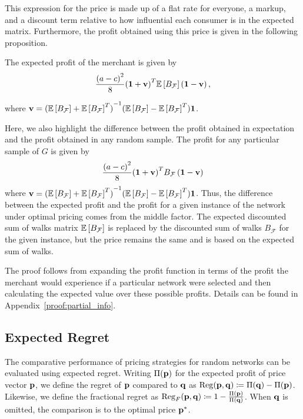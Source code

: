  This expression for the price is made up of a flat rate for everyone, a markup, and a discount term relative to how influential each consumer is in the expected matrix. Furthermore, the profit obtained using this price is given in the following proposition.

\begin{proposition}\label{prop:partial_info}\label{prop-info-prof}
     The expected profit of the merchant is given by 
     \begin{align*}
         \frac{{(a-c)}^2}{8} {\left(\mathbf{1} + \mathbf{v} \right)}^T \mathbb{E}\left[ B_\mathcal{F}\right] \left(\mathbf{1} - \mathbf{v} \right),
     \end{align*}

     where $\mathbf{v} = {(\mathbb{E}\left[ B_\mathcal{F}\right] + \mathbb{E}\left[ B_\mathcal{F}\right]^T)}^{-1} (\mathbb{E}\left[ B_\mathcal{F}\right] - \mathbb{E}\left[ B_\mathcal{F}\right]^T) \mathbf{1}$.
 \end{proposition}

Here, we also highlight the difference between the profit obtained in expectation and the profit obtained in any random sample. The profit for any particular sample of $G$ is given by
 \begin{equation*}
     \frac{{(a-c)}^2}{8} {\left(\mathbf{1} + \mathbf{v} \right)}^T B_\mathcal{F} \left(\mathbf{1} - \mathbf{v} \right)
 \end{equation*}
 where $\mathbf{v} = {(\mathbb{E}\left[ B_\mathcal{F}\right] + \mathbb{E}\left[ B_\mathcal{F}\right]^T)}^{-1} (\mathbb{E}\left[ B_\mathcal{F}\right] - \mathbb{E}\left[ B_\mathcal{F}\right]^T) \mathbf{1}$. Thus, the difference between the expected profit and the profit for a given instance of the network under optimal pricing comes from the middle factor. The expected discounted sum of walks matrix $\mathbb{E}\left[ B_\mathcal{F}\right]$ is replaced by the discounted sum of walks $B_\mathcal{F}$ for the given instance, but the price remains the same and is based on the expected sum of walks.


The proof follows from expanding the profit function in terms of the profit the merchant would experience if a particular network were selected and then calculating the expected value over these possible profits. Details can be found in Appendix~\ref{proof:partial_info}.



\subsection{Expected Regret}

The comparative performance of pricing strategies for random networks can be evaluated using expected regret. Writing $\Pi(\mathbf{p})$ for the expected profit of price vector $\mathbf{p}$, we define the regret of $\mathbf{p}$ compared to $\mathbf{q}$ as $\mathrm{Reg}(\mathbf{p}, \mathbf{q}) \coloneqq \Pi(\mathbf{q}) - \Pi(\mathbf{p})$. Likewise, we define the fractional regret as $\mathrm{Reg}_F(\mathbf{p}, \mathbf{q}) \coloneqq 1 - \frac{\Pi(\mathbf{p})}{\Pi(\mathbf{q})}$. When $\mathbf{q}$ is omitted, the comparison is to the optimal price $\mathbf{p}^*$.

